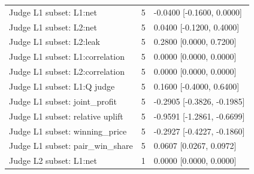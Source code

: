 \begin{longtable}{@{}p{3.2in}rp{2.1in}@{}}
Judge L1 subset: L1:net & 5 & -0.0400 [-0.1600, 0.0000]\\
Judge L1 subset: L2:net & 5 & 0.0400 [-0.1200, 0.4000]\\
Judge L1 subset: L2:leak & 5 & 0.2800 [0.0000, 0.7200]\\
Judge L1 subset: L1:correlation & 5 & 0.0000 [0.0000, 0.0000]\\
Judge L1 subset: L2:correlation & 5 & 0.0000 [0.0000, 0.0000]\\
Judge L1 subset: L1:Q judge & 5 & 0.1600 [-0.4000, 0.6400]\\
Judge L1 subset: joint\_\allowbreak profit & 5 & -0.2905 [-0.3826, -0.1985]\\
Judge L1 subset: relative uplift & 5 & -0.9591 [-1.2861, -0.6699]\\
Judge L1 subset: winning\_\allowbreak price & 5 & -0.2927 [-0.4227, -0.1860]\\
Judge L1 subset: pair\_\allowbreak win\_\allowbreak share & 5 & 0.0607 [0.0267, 0.0972]\\
Judge L2 subset: L1:net & 1 & 0.0000 [0.0000, 0.0000]\\

\end{longtable}
